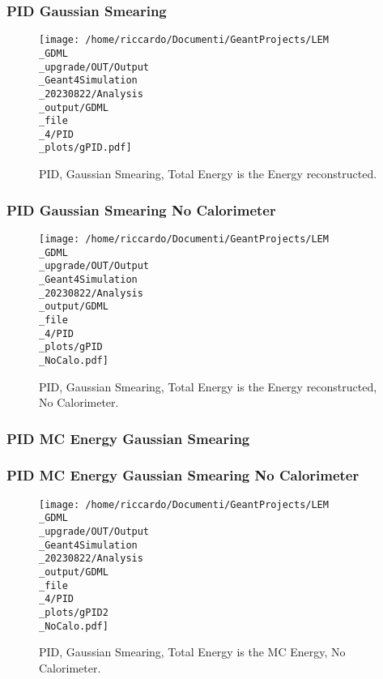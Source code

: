 \documentclass[8pt]{beamer}
\begin{document}
            \begin{frame}
                \frametitle{PID Gaussian Smearing}
            
        \begin{figure}[h]
            \centering
            \texttt{[image: /home/riccardo/Documenti/GeantProjects/LEM\\\_GDML\\\_upgrade/OUT/Output\\\_Geant4Simulation\\\_20230822/Analysis\\\_output/GDML\\\_file\\\_4/PID\\\_plots/gPID.pdf]}
            \caption{PID, Gaussian Smearing, Total Energy is the Energy reconstructed.}
        \end{figure}
        
            \end{frame}
            
            \begin{frame}
                \frametitle{PID Gaussian Smearing No Calorimeter}
            
        \begin{figure}[h]
            \centering
            \texttt{[image: /home/riccardo/Documenti/GeantProjects/LEM\\\_GDML\\\_upgrade/OUT/Output\\\_Geant4Simulation\\\_20230822/Analysis\\\_output/GDML\\\_file\\\_4/PID\\\_plots/gPID\\\_NoCalo.pdf]}
            \caption{PID, Gaussian Smearing, Total Energy is the Energy reconstructed, No Calorimeter.}
        \end{figure}
        
            \end{frame}
            
            \begin{frame}
                \frametitle{PID MC Energy Gaussian Smearing}
            
            \end{frame}
            
            \begin{frame}
                \frametitle{PID MC Energy Gaussian Smearing No Calorimeter}
            
        \begin{figure}[h]
            \centering
            \texttt{[image: /home/riccardo/Documenti/GeantProjects/LEM\\\_GDML\\\_upgrade/OUT/Output\\\_Geant4Simulation\\\_20230822/Analysis\\\_output/GDML\\\_file\\\_4/PID\\\_plots/gPID2\\\_NoCalo.pdf]}
            \caption{PID, Gaussian Smearing, Total Energy is the MC Energy, No Calorimeter.}
        \end{figure}
        
            \end{frame}
            
\end{document}
